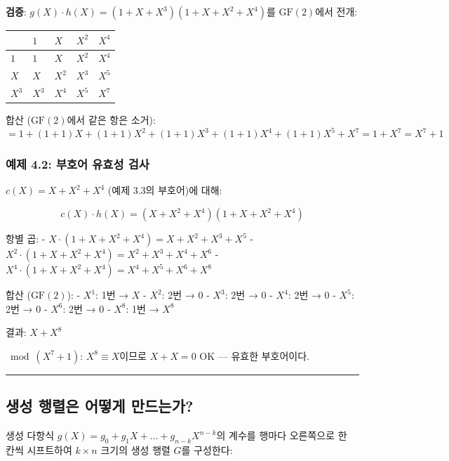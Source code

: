 \documentclass[
  oneside]{article}
\begin{document}
\textbf{검증}: \(g(X) \cdot h(X) = (1 + X + X^3)(1 + X + X^2 + X^4)\)를
\(\text{GF}(2)\)에서 전개:

\begin{longtable}[]{@{}lllll@{}}
\toprule\noalign{}
& \(1\) & \(X\) & \(X^2\) & \(X^4\) \\
\midrule\noalign{}
\endhead
\bottomrule\noalign{}
\endlastfoot
\(1\) & \(1\) & \(X\) & \(X^2\) & \(X^4\) \\
\(X\) & \(X\) & \(X^2\) & \(X^3\) & \(X^5\) \\
\(X^3\) & \(X^3\) & \(X^4\) & \(X^5\) & \(X^7\) \\
\end{longtable}

합산 (\(\text{GF}(2)\)에서 같은 항은 소거):
\[= 1 + (1+1)X + (1+1)X^2 + (1+1)X^3 + (1+1)X^4 + (1+1)X^5 + X^7 = 1 + X^7 = X^7 + 1\]

\subsubsection{예제 4.2: 부호어 유효성
검사}\label{uxc608uxc81c-4.2-uxbd80uxd638uxc5b4-uxc720uxd6a8uxc131-uxac80uxc0ac}

\(c(X) = X + X^2 + X^4\) (예제 3.3의 부호어)에 대해:

\[c(X) \cdot h(X) = (X + X^2 + X^4)(1 + X + X^2 + X^4)\]

항별 곱: - \(X \cdot (1 + X + X^2 + X^4) = X + X^2 + X^3 + X^5\) -
\(X^2 \cdot (1 + X + X^2 + X^4) = X^2 + X^3 + X^4 + X^6\) -
\(X^4 \cdot (1 + X + X^2 + X^4) = X^4 + X^5 + X^6 + X^8\)

합산 (\(\text{GF}(2)\)): - \(X^1\): 1번 → \(X\) - \(X^2\): 2번 → \(0\) -
\(X^3\): 2번 → \(0\) - \(X^4\): 2번 → \(0\) - \(X^5\): 2번 → \(0\) -
\(X^6\): 2번 → \(0\) - \(X^8\): 1번 → \(X^8\)

결과: \(X + X^8\)

\(\bmod (X^7 + 1)\): \(X^8 \equiv X\)이므로 \(X + X = 0\) OK --- 유효한
부호어이다.

\begin{center}\rule{0.5\linewidth}{0.5pt}\end{center}

\subsection{생성 행렬은 어떻게
만드는가?}\label{uxc0dduxc131-uxd589uxb82cuxc740-uxc5b4uxb5bbuxac8c-uxb9ccuxb4dcuxb294uxac00}

생성 다항식 \(g(X) = g_0 + g_1 X + \dots + g_{n-k} X^{n-k}\)의 계수를
행마다 오른쪽으로 한 칸씩 시프트하여 \(k \times n\) 크기의 생성 행렬
\(G\)를 구성한다:
\end{document}
